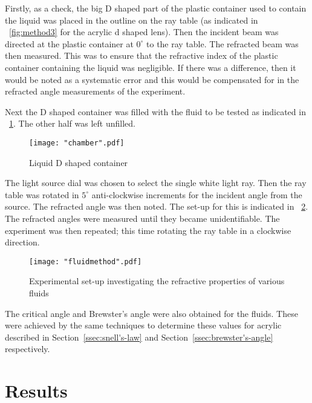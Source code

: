 \documentclass{article}
\newcommand{\figref}[2][\figurename~]{#1\ref{#2}}
\newcommand{\secref}[2][Section~]{#1\ref{#2}}
\begin{document}
\vspace{2mm}
\noindent
Firstly, as a check, the big D shaped part of the plastic container used to contain the liquid was placed in the outline on the ray table (as indicated in \figref{fig:method3} for the acrylic d shaped lens). Then the incident beam was directed at the plastic container at $0^{\circ}$ to the ray table. The refracted beam was then measured. This was to ensure that the refractive index of the plastic container containing the liquid was negligible. If there was a difference, then it would be noted as a systematic error and this would be compensated for in the refracted angle measurements of the experiment.

\vspace{2mm}
\noindent
Next the D shaped container was filled with the fluid to be tested as indicated in \figref{fig:method5}. The other half was left unfilled. 

\begin{figure}[h]
\centering
\texttt{[image: "chamber".pdf]}
\caption{Liquid D shaped container}
\label{fig:method5}
\end{figure}

\vspace{50mm}
\noindent
The light source dial was chosen to select the single white light ray. Then the ray  table was rotated in $5^{\circ}$ anti-clockwise increments for the incident angle from the source. The refracted angle was then noted. The set-up for this is indicated in \figref{fig:method6}. The refracted angles were measured until they became unidentifiable. The experiment was then repeated; this time rotating the ray table in a clockwise direction.

\begin{figure}[h]
\centering
\texttt{[image: "fluidmethod".pdf]}
\caption{Experimental set-up investigating the refractive properties of various fluids}
\label{fig:method6}
\end{figure}

\vspace{2mm}
\noindent
The critical angle and Brewster's angle were also obtained for the fluids. These were achieved by the same techniques to determine these values for acrylic described in \secref{ssec:snell's-law} and \secref{ssec:brewster's-angle} respectively.

\newpage
\section{Results}
\label{sec:results}
\end{document}
